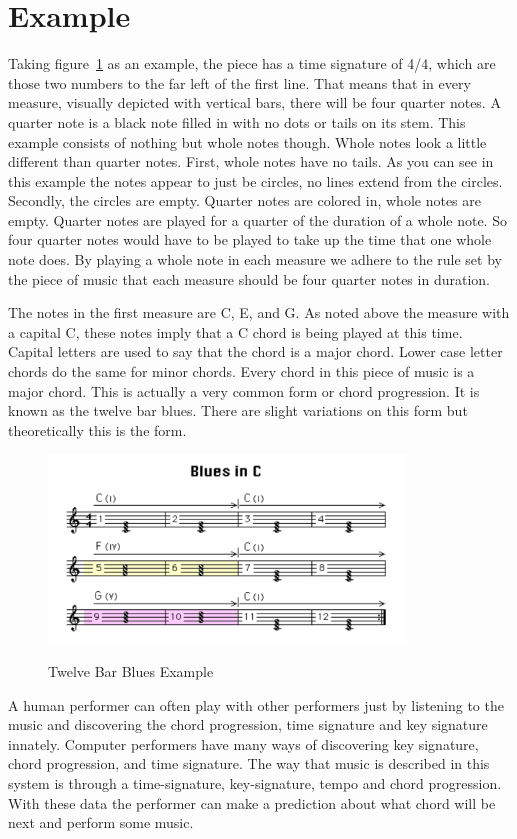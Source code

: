 \documentclass[12pt]{ucthesis}
\newcommand{\captionfonts}{\small\bf\ssp}
\begin{document}
\section{Example}

Taking figure~\ref{fig:blues-example} as an example, the piece has a time signature of 4/4, which are those two numbers to the far left of the first line. That means that in every measure, visually depicted with vertical bars, there will be four quarter notes. A quarter note is a black note filled in with no dots or tails on its stem. This example consists of nothing but whole notes though. Whole notes look a little different than quarter notes. First, whole notes have no tails. As you can see in this example the notes appear to just be circles, no lines extend from the circles. Secondly, the circles are empty. Quarter notes are colored in, whole notes are empty. Quarter notes are played for a quarter of the duration of a whole note. So four quarter notes would have to be played to take up the time that one whole note does. By playing a whole note in each measure we adhere to the rule set by the piece of music that each measure should be four quarter notes in duration.

The notes in the first measure are C, E, and G. As noted above the measure with a capital C, these notes imply that a C chord is being played at this time. Capital letters are used to say that the chord is a major chord. Lower case letter chords do the same for minor chords. Every chord in this piece of music is a major chord. This is actually a very common form or chord progression. It is known as the twelve bar blues. There are slight variations on this form but theoretically this is the form. 

\begin{figure}
\includegraphics[height=50mm]{blues-example.pdf}
\captionfonts
\caption[Twelve Bar Blues Example]{Twelve Bar Blues Example}
\label{fig:blues-example}
\end{figure}

A human performer can often play with other performers just by listening to the music and discovering the chord progression, time signature and key signature innately. Computer performers have many ways of discovering key signature, chord progression, and time signature. The way that music is described in this system is through a time-signature, key-signature, tempo and chord progression. With these data the performer can make a prediction about what chord will be next and perform some music.
\end{document}
